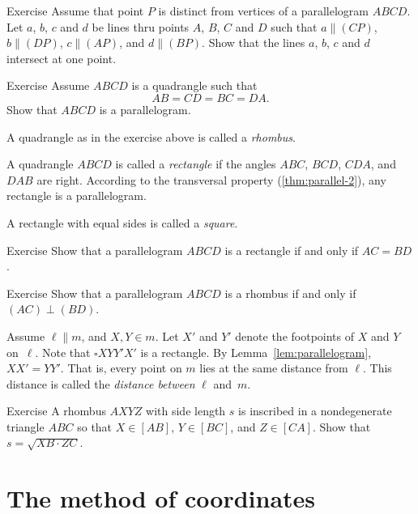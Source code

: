 \begin{thm}{Exercise}\label{ex:4parallels}
Assume that point $P$ is distinct from vertices of a parallelogram $ABCD$.
Let $a$, $b$, $c$ and $d$ be lines thru points $A$, $B$, $C$ and $D$ such that 
$a\parallel (CP)$,
$b\parallel (DP)$,
$c\parallel (AP)$, and
$d\parallel (BP)$.
Show that the lines $a$, $b$, $c$ and $d$ intersect at one point.
\end{thm}


\begin{thm}{Exercise}\label{ex:romb}
Assume $ABCD$ is a quadrangle such that
\[AB=CD=BC=DA.\]
Show that $ABCD$ is a parallelogram.
\end{thm}

A quadrangle as in the exercise above is called a \emph{rhombus}.

A quadrangle $ABCD$ is called a \emph{rectangle} if the angles $ABC$, $BCD$, $CDA$, and $DAB$ are right.
According to the transversal property (\ref{thm:parallel-2}),
any rectangle is a parallelogram.

A rectangle with equal sides is called a \emph{square}.

\begin{thm}{Exercise}\label{ex:rectangle}
Show that a parallelogram $ABCD$ is a rectangle
if and only if $AC=BD$.
\end{thm}

\begin{thm}{Exercise}\label{ex:romb2}
Show that a parallelogram $ABCD$ is a rhombus
if and only if $(AC)\perp (BD)$.
\end{thm}

Assume $\ell\parallel m$, and $X,Y\in m$.
Let $X'$ and $Y'$ denote the footpoints of $X$ and $Y$ on~$\ell$.
Note that $\square XYY'X'$ is a rectangle.
By Lemma~\ref{lem:parallelogram}, $XX'=YY'$.
That is, every point on $m$ lies at the same distance from $\ell$.
This distance is called the \emph{distance between} $\ell$ and~$m$.

\begin{thm}{Exercise}\label{ex:inscribed-rhombus}
A rhombus $AXYZ$ with side length $s$ is inscribed in a nondegenerate triangle $ABC$ so that $X\in [AB]$, $Y\in [BC]$, and $Z\in[CA]$.
Show that $s=\sqrt{XB\cdot ZC}$.
\end{thm}

\section{The method of coordinates}

